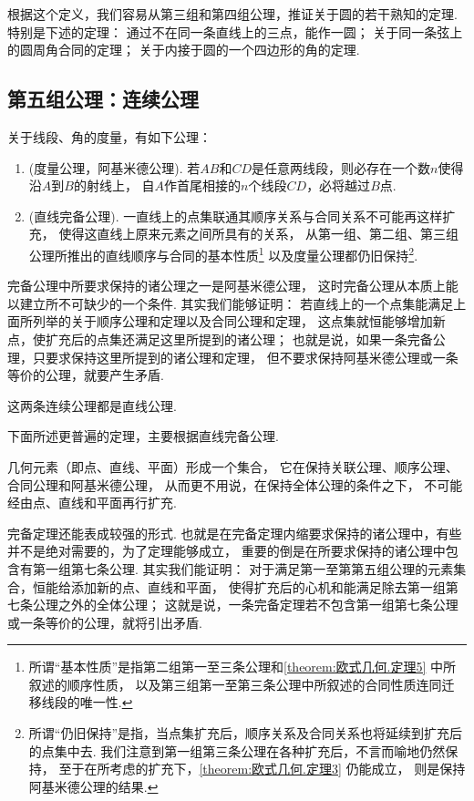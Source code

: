 根据这个定义，我们容易从第三组和第四组公理，推证关于圆的若干熟知的定理.
特别是下述的定理：
通过不在同一条直线上的三点，能作一圆；
关于同一条弦上的圆周角合同的定理；
关于内接于圆的一个四边形的角的定理.

\subsection{第五组公理：连续公理}

\begin{axiom}[连续公理]
关于线段、角的度量，有如下公理：
\begin{enumerate}
	\item (度量公理，阿基米德公理).
	若\(AB\)和\(CD\)是任意两线段，则必存在一个数\(n\)使得沿\(A\)到\(B\)的射线上，
	自\(A\)作首尾相接的\(n\)个线段\(CD\)，必将越过\(B\)点.
	\item (直线完备公理).
	一直线上的点集联通其顺序关系与合同关系不可能再这样扩充，
	使得这直线上原来元素之间所具有的关系，
	从第一组、第二组、第三组公理所推出的直线顺序与合同的基本性质\footnote{%
	所谓“基本性质”是指第二组第一至三条公理和\cref{theorem:欧式几何.定理5} 中所叙述的顺序性质，
	以及第三组第一至第三条公理中所叙述的合同性质连同迁移线段的唯一性.}
	以及度量公理都仍旧保持\footnote{%
	所谓“仍旧保持”是指，当点集扩充后，顺序关系及合同关系也将延续到扩充后的点集中去.
	我们注意到第一组第三条公理在各种扩充后，不言而喻地仍然保持，
	至于在所考虑的扩充下，\cref{theorem:欧式几何.定理3} 仍能成立，
	则是保持阿基米德公理的结果.}.
\end{enumerate}
\end{axiom}

完备公理中所要求保持的诸公理之一是阿基米德公理，
这时完备公理从本质上能以建立所不可缺少的一个条件.
其实我们能够证明：
若直线上的一个点集能满足上面所列举的关于顺序公理和定理以及合同公理和定理，
这点集就恒能够增加新点，使扩充后的点集还满足这里所提到的诸公理；
也就是说，如果一条完备公理，只要求保持这里所提到的诸公理和定理，
但不要求保持阿基米德公理或一条等价的公理，就要产生矛盾.

这两条连续公理都是直线公理.

下面所述更普遍的定理，主要根据直线完备公理.
\begin{theorem}[完备定理]\label{theorem:欧式几何.定理32}
几何元素（即点、直线、平面）形成一个集合，
它在保持关联公理、顺序公理、合同公理和阿基米德公理，
从而更不用说，在保持全体公理的条件之下，
不可能经由点、直线和平面再行扩充.
\end{theorem}

完备定理还能表成较强的形式.
也就是在完备定理内缩要求保持的诸公理中，有些并不是绝对需要的，为了定理能够成立，
重要的倒是在所要求保持的诸公理中包含有第一组第七条公理.
其实我们能证明：
对于满足第一至第第五组公理的元素集合，恒能给添加新的点、直线和平面，
使得扩充后的心机和能满足除去第一组第七条公理之外的全体公理；
这就是说，一条完备定理若不包含第一组第七条公理或一条等价的公理，就将引出矛盾.

